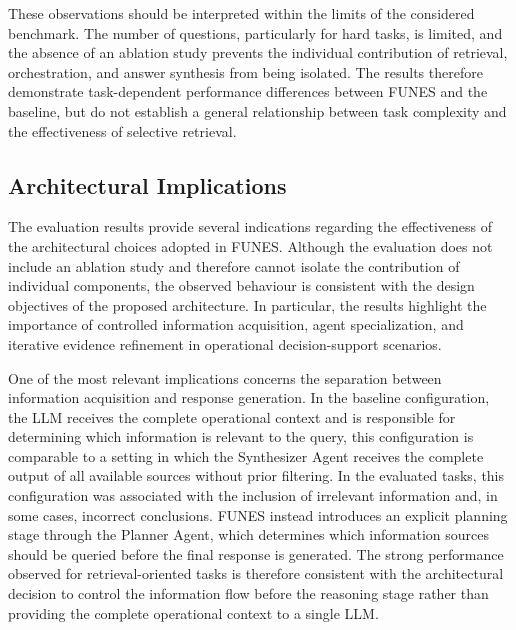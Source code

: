 These observations should be interpreted within the limits of the considered benchmark. The number of questions, particularly for hard tasks, is limited, and the absence of an ablation study prevents the individual contribution of retrieval, orchestration, and answer synthesis from being isolated. The results therefore demonstrate task-dependent performance differences between FUNES and the baseline, but do not establish a general relationship between task complexity and the effectiveness of selective retrieval.


\subsection{Architectural Implications}
\label{sec:architectural implications}

The evaluation results provide several indications regarding the effectiveness of the architectural choices adopted in FUNES. Although the evaluation does not include an ablation study and therefore cannot isolate the contribution of individual components, the observed behaviour is consistent with the design objectives of the proposed architecture. In particular, the results highlight the importance of controlled information acquisition, agent specialization, and iterative evidence refinement in operational decision-support scenarios.

One of the most relevant implications concerns the separation between information acquisition and response generation. In the baseline configuration, the LLM receives the complete operational context and is responsible for determining which information is relevant to the query, this configuration is comparable to a setting in which the Synthesizer Agent receives the complete output of all available sources without prior filtering. In the evaluated tasks, this configuration was associated with the inclusion of irrelevant information and, in some cases, incorrect conclusions. FUNES instead introduces an explicit planning stage through the Planner Agent, which determines which information sources should be queried before the final response is generated. The strong performance observed for retrieval-oriented tasks is therefore consistent with the architectural decision to control the information flow before the reasoning stage rather than providing the complete operational context to a single LLM.


